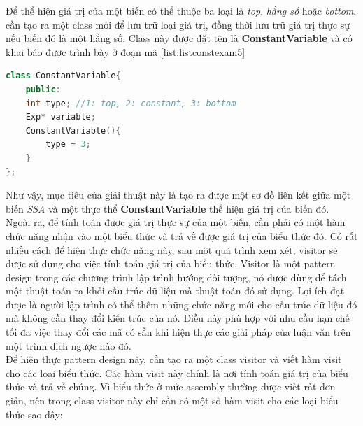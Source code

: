 Để thể hiện giá trị của một biến có thể thuộc ba loại là \textit{top}, \textit{hằng số} hoặc \textit{bottom}, cần tạo ra một class mới để lưu trữ loại giá trị, đồng thời lưu trữ giá trị thực sự nếu biến đó là một hằng số. Class này được đặt tên là \textbf{ConstantVariable} và có khai báo được trình bày ở đoạn mã \ref{list:listconstexam5}
\begin{lstlisting}[caption={Đoạn mã thể hiện class ConstantVariable},label={list:listconstexam5}, language=c++]
class ConstantVariable{
	public:
	int type; //1: top, 2: constant, 3: bottom
	Exp* variable;
	ConstantVariable(){
		type = 3;
	}
};
\end{lstlisting}
Như vậy, mục tiêu của giải thuật này là tạo ra được một sơ đồ liên kết giữa một biến \textit{SSA} và một thực thể \textbf{ConstantVariable} thể hiện giá trị của biến đó. \\

Ngoài ra, để tính toán được giá trị thực sự của một biến, cần phải có một hàm chức năng nhận vào một biểu thức và trả về được giá trị của biểu thức đó. Có rất nhiều cách để hiện thực chức năng này, sau một quá trình xem xét, visitor sẽ được sử dụng cho việc tính toán giá trị của biểu thức. Visitor là một pattern design trong các chương trình lập trình hướng đối tượng, nó được dùng để tách một thuật toán ra khỏi cấu trúc dữ liệu mà thuật toán đó sử dụng. Lợi ích đạt được là người lập trình có thể thêm những chức năng mới cho cấu trúc dữ liệu đó mà không cần thay đổi kiến trúc của nó. Điều này phù hợp với nhu cầu hạn chế tối đa việc thay đổi các mã có sẵn khi hiện thực các giải pháp của luận văn trên một trình dịch ngược nào đó.\\

Để hiện thực pattern design này, cần tạo ra một class visitor và viết hàm visit cho các loại biểu thức. Các hàm visit này chính là nơi tính toán giá trị của biểu thức và trả về chúng. Vì biểu thức ở mức assembly thường được viết rất đơn giản, nên trong class visitor này chỉ cần có một số hàm visit cho các loại biểu thức sao đây:


